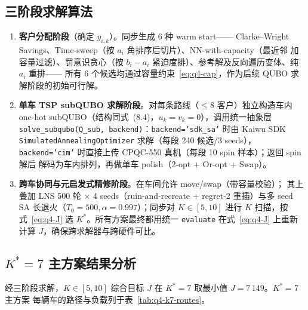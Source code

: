 \documentclass[UTF8,12pt,a4paper]{ctexart}
\begin{document}
\subsection{三阶段求解算法}
\label{subsec:q4-algo}

\begin{enumerate}
  \item[(i)] \textbf{客户分配阶段}（确定 $y_{i,k}$）。同步生成 6 种 warm start——
    Clarke--Wright Savings、Time-sweep（按 $a_i$ 角排序后切片）、NN-with-capacity（最近邻
    加容量过滤）、罚意识贪心（按 $b_i-a_i$ 紧迫度排）、参考解及反向遍历变体、纯 $a_i$ 重排——
    所有 6 个候选均通过容量约束~\eqref{eq:q4-cap}，作为后续 QUBO 求解阶段的初始可行解。
  \item[(ii)] \textbf{单车 TSP subQUBO 求解阶段}。对每条路线（$\le 8$ 客户）独立构造车内
    one-hot subQUBO（结构同式~(8.4)，$u_k=v_k=0$），调用统一抽象层
    \texttt{solve\_subqubo(Q\_sub, backend)}：\texttt{backend='sdk\_sa'} 时由 Kaiwu SDK
    \texttt{SimulatedAnnealingOptimizer} 求解（每段 240 候选/3 seeds），
    \texttt{backend='cim'} 时直接上传 CPQC-550 真机（每段 10 spin 样本）；返回 spin 解后
    解码为车内排列，再做单车 polish（2-opt + Or-opt + Swap）。
  \item[(iii)] \textbf{跨车协同与元启发式精修阶段}。在车间允许 move/swap（带容量校验）；
    其上叠加 LNS 500 轮 $\times$ 4 seeds（ruin-and-recreate + regret-2 重插）与多 seed SA
    长退火（$T_0=500,\alpha=0.997$）；同步对 $K\in[5,10]$ 进行 $K$ 扫描，按
    式~\eqref{eq:q4-J} 选 $K^*$。所有方案最终都用统一 \texttt{evaluate} 在式~\eqref{eq:q4-J}
    上重新计算 $J$，确保跨求解器与跨硬件可比。
\end{enumerate}

\subsection{$K^*\!=\!7$ 主方案结果分析}
\label{subsec:q4-k7}

经三阶段求解，$K\in[5,10]$ 综合目标 $J$ 在 $K^*=7$ 取最小值 $J=7\,149$。$K^*=7$ 主方案
每辆车的路径与负载列于表~\ref{tab:q4-k7-routes}。
\end{document}
